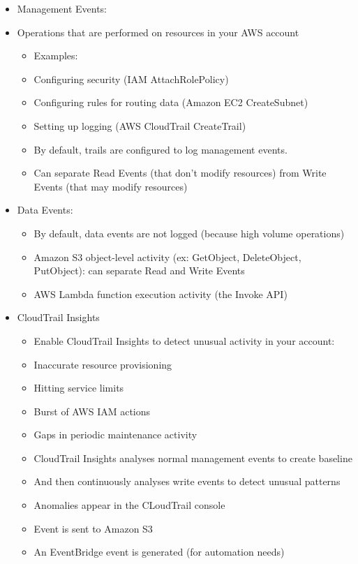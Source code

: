 \begin{itemize}
    \item Management Events:
    \item Operations that are performed on resources in your AWS account
    \begin{itemize}
        \item Examples:
        \item Configuring security (IAM AttachRolePolicy)
        \item Configuring rules for routing data (Amazon EC2 CreateSubnet)
        \item Setting up logging (AWS CloudTrail CreateTrail)
        \item By default, trails are configured to log management events.
        \item Can separate Read Events (that don't modify resources) from Write Events (that may modify resources)
    \end{itemize}

    \item Data Events:
    \begin{itemize}
        \item By default, data events are not logged (because high volume operations)
        \item Amazon S3 object-level activity (ex: GetObject, DeleteObject, PutObject): can separate Read and Write Events
        \item AWS Lambda function execution activity (the Invoke API)
    \end{itemize}

    \item CloudTrail Insights
    \begin{itemize}
        \item Enable CloudTrail Insights to detect unusual activity in your account:
        \item Inaccurate resource provisioning
        \item Hitting service limits
        \item Burst of AWS IAM actions
        \item Gaps in periodic maintenance activity
        \item CloudTrail Insights analyses normal management events to create baseline
        \item And then continuously analyses write events to detect unusual patterns
        \item Anomalies appear in the CLoudTrail console
        \item Event is sent to Amazon S3
        \item An EventBridge event is generated (for automation needs)
    \end{itemize}


\end{itemize}

